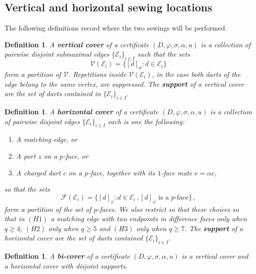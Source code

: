 \documentclass[11pt]{article}
\newtheorem{definition}[theorem]{Definition}
\theoremstyle{remark}
\newcommand{\orb}[1]{[#1]_{\sigma}}
\newcommand{\VV}{\mathsf V}
\newcommand{\cF}{\mathcal F}
\newcommand{\cV}{\mathcal V}
\newcommand{\cE}{\mathcal E}
\begin{document}
\subsection{Vertical and horizontal sewing locations}

The following definitions record where the two sewings will be performed.

\begin{definition}\label{def:Vdata}
A {\bf vertical cover} of a certificate $(D,\varphi, \sigma,\alpha, u)$ is
a collection of pairwise disjoint submaximal edges $\{\cE_i\}_{i\in I}$ such that
the sets
\[
       \cV(\cE_i)=\{\orb d:d\in \cE_i\}
\]
form a partition of $\cV$.  Repetitions inside $\cV(\cE_i)$, in the case both darts of the edge belong to the same vertex,  are suppressed. The {\bf support} of a vertical cover are the set of darts contained in $\{\cE_i\}_{i\in I}$. 
\end{definition}

\begin{definition}\label{def:Hdata}
A {\bf horizontal cover} of a certificate $(D,\varphi, \sigma,\alpha, u)$ is a
collection of pairwise disjoint edges $\{\cE_i\}_{i\in I}$ each is one the following:
\begin{enumerate}
\item[(H1)] A matching edge, or
\item[(H2)] A port $z$ on a $p$-face, or
\item[(H3)] A charged dart $c$ on a $p$-face, together with its $1$-face mate
$e=\alpha c$,  %
\end{enumerate}
so that the sets 
$$ \cF(\cE_i) = \big \{ [d]_\varphi : d\in \cE_i \, , [d]_\varphi \text{ is a $p$-face} \big \}\, ,$$
form a partition of the set of $p$-faces. We also restrict so that these choices so that in $(H1)$ a matching edge with two endpoints in difference faces only when $q \geq 4$; $(H2)$ only when $q \geq 5$ and $(H3)$ only when $q \geq 7$. The {\bf support} of a horizontal cover are the set of darts contained $\{\cE_i\}_{i\in I}$. 
\end{definition}

\begin{definition}\label{def:bicover} A {\bf bi-cover} of a certificate $(D,\varphi, \sigma,\alpha, u)$ is a vertical cover and a horizontal cover with disjoint supports.   
\end{definition}
\end{document}
